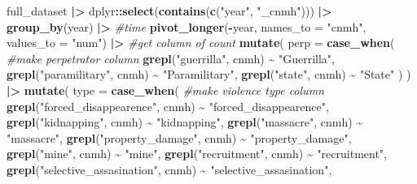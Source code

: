 \documentclass[
]{article}
\newenvironment{Shaded}{\begin{snugshade}}{\end{snugshade}}
\newcommand{\AttributeTok}[1]{\textcolor[rgb]{0.13,0.29,0.53}{#1}}
\newcommand{\CommentTok}[1]{\textcolor[rgb]{0.56,0.35,0.01}{\textit{#1}}}
\newcommand{\FunctionTok}[1]{\textcolor[rgb]{0.13,0.29,0.53}{\textbf{#1}}}
\newcommand{\NormalTok}[1]{#1}
\newcommand{\SpecialCharTok}[1]{\textcolor[rgb]{0.81,0.36,0.00}{\textbf{#1}}}
\newcommand{\StringTok}[1]{\textcolor[rgb]{0.31,0.60,0.02}{#1}}
\begin{document}
\begin{Shaded}
\begin{Highlighting}[]
\NormalTok{full\_dataset }\SpecialCharTok{|\textgreater{}}
\NormalTok{  dplyr}\SpecialCharTok{::}\FunctionTok{select}\NormalTok{(}\FunctionTok{contains}\NormalTok{(}\FunctionTok{c}\NormalTok{(}\StringTok{"year"}\NormalTok{, }\StringTok{"\_cnmh"}\NormalTok{))) }\SpecialCharTok{|\textgreater{}} 
  \FunctionTok{group\_by}\NormalTok{(year) }\SpecialCharTok{|\textgreater{}} \CommentTok{\#time}
  \FunctionTok{pivot\_longer}\NormalTok{(}\SpecialCharTok{{-}}\NormalTok{year, }\AttributeTok{names\_to =} \StringTok{"cnmh"}\NormalTok{, }\AttributeTok{values\_to =} \StringTok{"num"}\NormalTok{) }\SpecialCharTok{|\textgreater{}} \CommentTok{\#get column of count}
  \FunctionTok{mutate}\NormalTok{(}
    \AttributeTok{perp =} \FunctionTok{case\_when}\NormalTok{( }\CommentTok{\#make perpetrator column}
      \FunctionTok{grepl}\NormalTok{(}\StringTok{"guerrilla"}\NormalTok{, cnmh) }\SpecialCharTok{\textasciitilde{}} \StringTok{"Guerrilla"}\NormalTok{,}
      \FunctionTok{grepl}\NormalTok{(}\StringTok{"paramilitary"}\NormalTok{, cnmh) }\SpecialCharTok{\textasciitilde{}} \StringTok{"Paramilitary"}\NormalTok{,}
      \FunctionTok{grepl}\NormalTok{(}\StringTok{"state"}\NormalTok{, cnmh) }\SpecialCharTok{\textasciitilde{}} \StringTok{"State"}
\NormalTok{    )}
\NormalTok{  ) }\SpecialCharTok{|\textgreater{}}
  \FunctionTok{mutate}\NormalTok{(}
    \AttributeTok{type =} \FunctionTok{case\_when}\NormalTok{( }\CommentTok{\#make violence type column}
      \FunctionTok{grepl}\NormalTok{(}\StringTok{"forced\_disappearence"}\NormalTok{, cnmh) }\SpecialCharTok{\textasciitilde{}} \StringTok{"forced\_disappearence"}\NormalTok{,}
      \FunctionTok{grepl}\NormalTok{(}\StringTok{"kidnapping"}\NormalTok{, cnmh) }\SpecialCharTok{\textasciitilde{}} \StringTok{"kidnapping"}\NormalTok{,}
      \FunctionTok{grepl}\NormalTok{(}\StringTok{"massacre"}\NormalTok{, cnmh) }\SpecialCharTok{\textasciitilde{}} \StringTok{"massacre"}\NormalTok{,}
      \FunctionTok{grepl}\NormalTok{(}\StringTok{"property\_damage"}\NormalTok{, cnmh) }\SpecialCharTok{\textasciitilde{}} \StringTok{"property\_damage"}\NormalTok{,}
      \FunctionTok{grepl}\NormalTok{(}\StringTok{"mine"}\NormalTok{, cnmh) }\SpecialCharTok{\textasciitilde{}} \StringTok{"mine"}\NormalTok{,}
      \FunctionTok{grepl}\NormalTok{(}\StringTok{"recruitment"}\NormalTok{, cnmh) }\SpecialCharTok{\textasciitilde{}} \StringTok{"recruitment"}\NormalTok{,}
      \FunctionTok{grepl}\NormalTok{(}\StringTok{"selective\_assasination"}\NormalTok{, cnmh) }\SpecialCharTok{\textasciitilde{}} \StringTok{"selective\_assasination"}\NormalTok{,}

\end{Highlighting}
\end{Shaded}
\end{document}
